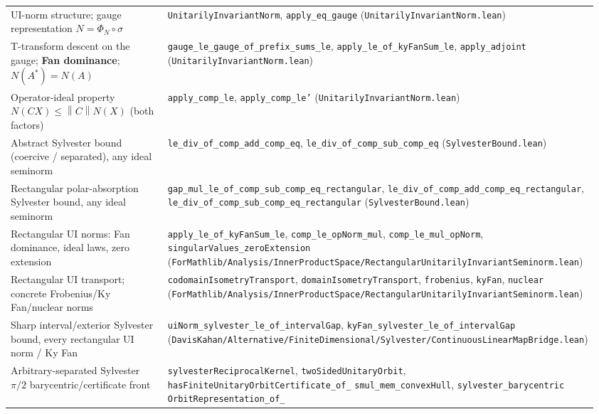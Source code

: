 \documentclass[11pt]{article}
\newcommand{\norm}[1]{\left\lVert #1\right\rVert}
\theoremstyle{remark}
\begin{document}
\begin{center}
\begin{tabular}{@{}p{0.40\linewidth}p{0.56\linewidth}@{}}
UI-norm structure; gauge representation $N=\Phi_N\circ\sigma$
  & \texttt{UnitarilyInvariantNorm}, \texttt{apply\_eq\_gauge}
    (\texttt{UnitarilyInvariantNorm.lean}) \\
T-transform descent on the gauge; \textbf{Fan dominance}; $N(A^{*})=N(A)$
  & \texttt{gauge\_le\_gauge\_of\_prefix\_sums\_le},
    \texttt{apply\_le\_of\_kyFanSum\_le}, \texttt{apply\_adjoint}
    (\texttt{UnitarilyInvariantNorm.lean}) \\
Operator-ideal property $N(CX)\le\norm{C}N(X)$ (both factors)
  & \texttt{apply\_comp\_le}, \texttt{apply\_comp\_le'}
    (\texttt{UnitarilyInvariantNorm.lean}) \\
Abstract Sylvester bound (coercive / separated), any ideal seminorm
  & \texttt{le\_div\_of\_comp\_add\_comp\_eq},
    \texttt{le\_div\_of\_comp\_sub\_comp\_eq} (\texttt{SylvesterBound.lean}) \\
Rectangular polar-absorption Sylvester bound, any ideal seminorm
  & \texttt{gap\_mul\_le\_of\_comp\_sub\_comp\_eq\_rectangular},
    \texttt{le\_div\_of\_comp\_add\_comp\_eq\_rectangular},
    \texttt{le\_div\_of\_comp\_sub\_comp\_eq\_rectangular}
    (\texttt{SylvesterBound.lean}) \\
Rectangular UI norms: Fan dominance, ideal laws, zero extension
  & \texttt{apply\_le\_of\_kyFanSum\_le},
    \texttt{comp\_le\_opNorm\_mul}, \texttt{comp\_le\_mul\_opNorm},
    \texttt{singularValues\_zeroExtension}
    (\texttt{ForMathlib/Analysis/InnerProductSpace/RectangularUnitarilyInvariantSeminorm.lean}) \\
Rectangular UI transport; concrete Frobenius/Ky Fan/nuclear norms
  & \texttt{codomainIsometryTransport}, \texttt{domainIsometryTransport},
    \texttt{frobenius}, \texttt{kyFan}, \texttt{nuclear}
    (\texttt{ForMathlib/Analysis/InnerProductSpace/RectangularUnitarilyInvariantSeminorm.lean}) \\
Sharp interval/exterior Sylvester bound, every rectangular UI norm / Ky Fan
  & \texttt{uiNorm\_sylvester\_le\_of\_}\allowbreak\texttt{intervalGap},
    \texttt{kyFan\_sylvester\_le\_of\_}\allowbreak\texttt{intervalGap}
    (\texttt{DavisKahan/Alternative/FiniteDimensional/Sylvester/ContinuousLinearMapBridge.lean}) \\
Arbitrary-separated Sylvester $\pi/2$ barycentric/certificate front
  & \texttt{sylvesterReciprocalKernel},
    \texttt{twoSidedUnitaryOrbit},
    \texttt{hasFiniteUnitaryOrbitCertificate\_of\_}\allowbreak
      \texttt{smul\_mem\_convexHull},
    \texttt{sylvester\_barycentric}\allowbreak
      \texttt{OrbitRepresentation\_of\_}\allowbreak

\end{tabular}
\end{center}
\end{document}
